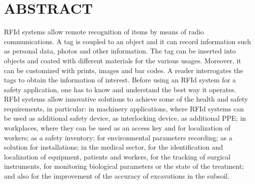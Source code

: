 \chapter*{ABSTRACT}
RFId systems allow remote recognition of items by
means of radio communications.
A tag is coupled to an object and it can record information
such as personal data, photos and other information.
The tag can be inserted into objects and coated with different
materials for the various usages. Moreover, it can be customized
with prints, images and bar codes.
A reader interrogates the tags to obtain the information of
interest.
Before using an RFId system for a safety application, one has
to know and understand the best way it operates.
RFId systems allow innovative solutions to achieve some of
the health and safety requirements, in particular: in machinery
applications, where RFId systems can be used as additional
safety device, as interlocking device, as additional PPE; in
workplaces, where they can be used as an access key and for
localization of workers; as a safety inventory; for environmental
parameters recording; as a solution for installations; in the
medical sector, for the identification and localization of
equipment, patients and workers, for the tracking of surgical
instruments, for monitoring biological parameters or the state of
the treatment; and also for the improvement of the accuracy of
excavations in the subsoil.






